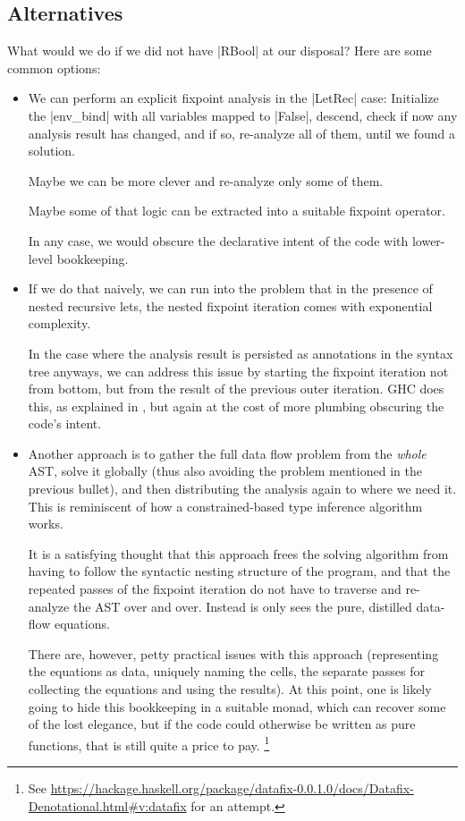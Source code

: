 \documentclass[manuscript,anonymous,screen,acmsmall]{acmart}
\begin{document}
\subsection{Alternatives}
What would we do if we did not have |RBool| at our disposal? Here are some common options:
\begin{itemize}
\item We can perform an explicit fixpoint analysis in the |LetRec| case: Initialize the |env_bind| with all variables mapped to |False|, descend, check if now any analysis result has changed, and if so, re-analyze all of them, until we found a solution.

Maybe we can be more clever and re-analyze only some of them.

Maybe some of that logic can be extracted into a suitable fixpoint operator.

In any case, we would obscure the declarative intent of the code with lower-level bookkeeping.

\item If we do that naively, we can run into the problem that in the presence of nested recursive lets, the nested fixpoint iteration comes with exponential complexity.

In the case where the analysis result is persisted as annotations in the syntax tree anyways, we can address this issue by starting the fixpoint iteration not from bottom, but from the result of the previous outer iteration.
%
GHC does this, as explained in \citet[Section 6.6]{modular}, but again at the cost of more plumbing obscuring the code's intent.

\item Another approach is to gather the full data flow problem from the \emph{whole} AST, solve it globally (thus also avoiding the problem mentioned in the previous bullet), and then distributing the analysis again to where we need it. This is reminiscent of how a constrained-based type inference algorithm works.

It is a satisfying thought that this approach frees the solving algorithm from having to follow the syntactic nesting structure of the program, and that the repeated passes of the fixpoint iteration do not have to traverse and re-analyze the AST over and over. Instead is only sees the pure, distilled data-flow equations.

There are, however, petty practical issues with this approach (representing the equations as data, uniquely naming the cells, the separate passes for collecting the equations and using the results).
At this point, one is likely going to hide this bookkeeping in a suitable monad, which can recover some of the lost elegance, but if the code could otherwise be written as pure functions, that is still quite a price to pay.%
\footnote{See \url{https://hackage.haskell.org/package/datafix-0.0.1.0/docs/Datafix-Denotational.html\#v:datafix} for an attempt.}
\end{itemize}
\end{document}
